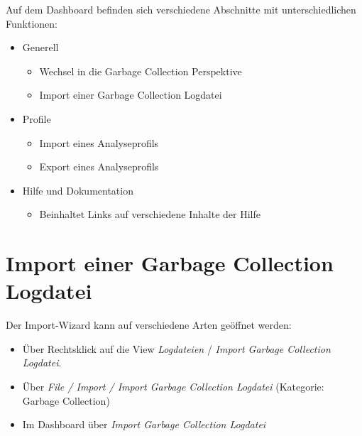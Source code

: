 Auf dem Dashboard befinden sich verschiedene Abschnitte mit unterschiedlichen Funktionen:
\begin{itemize}
	\item Generell 
		\begin{itemize}
			\item Wechsel in die Garbage Collection Perspektive
			\item Import einer Garbage Collection Logdatei
		\end{itemize}
	\item Profile
		\begin{itemize}
			\item Import eines Analyseprofils
			\item Export eines Analyseprofils
		\end{itemize}
	\item Hilfe und Dokumentation
		\begin{itemize}
			\item Beinhaltet Links auf verschiedene Inhalte der Hilfe
		\end{itemize}
\end{itemize}

\section*{Import einer Garbage Collection Logdatei}
Der Import-Wizard kann auf verschiedene Arten geöffnet werden:
\begin{itemize}
	\item Über Rechtsklick auf die View \textit{Logdateien} / \textit{Import Garbage Collection Logdatei}.
	\item Über \textit{File / Import / Import Garbage Collection Logdatei} (Kategorie: Garbage Collection)
	\item Im Dashboard über \textit{Import Garbage Collection Logdatei}
\end{itemize}

